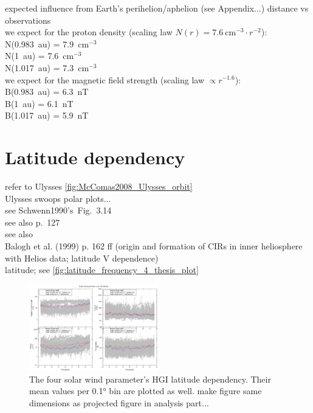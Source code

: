 expected influence from Earth's perihelion/aphelion (see Appendix...) distance vs observations\\
we expect for the proton density (scaling law $N(r) = 7.6~\text{cm}^{-3} \cdot r^{-2}$):\\
N(0.983~au) = 7.9~cm$^{-3}$\\
N(1~au) = 7.6~cm$^{-3}$\\
N(1.017~au) = 7.3~cm$^{-3}$\\
we expect for the magnetic field strength (scaling law $\propto r^{-1.6}$):\\
B(0.983~au) = 6.3~nT\\
B(1~au) = 6.1~nT\\
B(1.017~au) = 5.9~nT\\


\section{Latitude dependency}
refer to Ulysses \autoref{fig:McComas2008_Ulysses_orbit}\\
Ulysses swoops polar plots...\\

see Schwenn1990's~Fig.~3.14\\
see also \citet{Schwenn1990} p.~127\\
see also \citet{Richardson1995}\\
Balogh et al. (1999) p. 162 ff (origin and formation of CIRs in inner heliosphere with Helios data; latitude V dependence)\\

latitude; see \autoref{fig:latitude_frequency_4_thesis_plot}
\begin{figure}[htb]
	\centering
	\includegraphics[width=0.5\textwidth]{images/gnuplots/latitude_frequency_4_thesis_plot.png}
	\caption{The four solar wind parameter's HGI latitude dependency. Their mean values per 0.1° bin are plotted as well. make figure same dimensions as projected figure in analysis part...}
	\label{fig:latitude_frequency_4_thesis_plot}
\end{figure}

